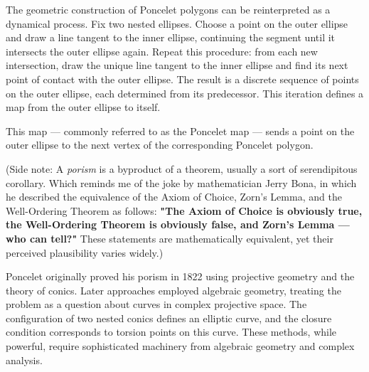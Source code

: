 \begin{center}
\end{center}

The geometric construction of Poncelet polygons can be reinterpreted as a dynamical process. Fix two nested ellipses. Choose a point on the outer ellipse and draw a line tangent to the inner ellipse, continuing the segment until it intersects the outer ellipse again. Repeat this procedure: from each new intersection, draw the unique line tangent to the inner ellipse and find its next point of contact with the outer ellipse. The result is a discrete sequence of points on the outer ellipse, each determined from its predecessor. This iteration defines a map from the outer ellipse to itself.

This map — commonly referred to as the Poncelet map — sends a point on the outer ellipse to the next vertex of the corresponding Poncelet polygon.

(Side note: A \emph{porism} is a byproduct of a theorem, usually a sort of serendipitous corollary. Which reminds me of the joke by mathematician Jerry Bona, in which he described the equivalence of the Axiom of Choice, Zorn's Lemma, and the Well-Ordering Theorem as follows: \textbf{"The Axiom of Choice is obviously true, the Well-Ordering Theorem is obviously false, and Zorn's Lemma — who can tell?"} These statements are mathematically equivalent, yet their perceived plausibility varies widely.)

Poncelet originally proved his porism in 1822 using projective geometry and the theory of conics. Later approaches employed algebraic geometry, treating the problem as a question about curves in complex projective space. The configuration of two nested conics defines an elliptic curve, and the closure condition corresponds to torsion points on this curve. These methods, while powerful, require sophisticated machinery from algebraic geometry and complex analysis.

